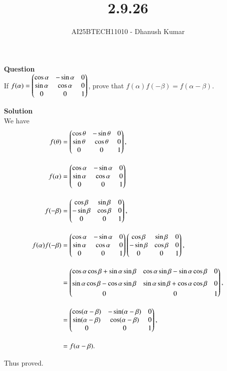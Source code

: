 \documentclass[journal]{IEEEtran}
\begin{document}
\title{2.9.26}
\author{AI25BTECH11010 - Dhanush Kumar}
\maketitle
\renewcommand{\thefigure}{\theenumi}
\renewcommand{\thetable}{\theenumi}

\noindent
\textbf{Question}\\
If $f(\alpha) = \begin{pmatrix}\cos\alpha & -\sin\alpha & 0 \\ \sin\alpha & \cos\alpha & 0 \\ 0 & 0 & 1\end{pmatrix}$,  
prove that $f(\alpha)f(-\beta) = f(\alpha-\beta)$.

\bigskip
\noindent

\textbf{Solution}\\

We have
\begin{align}
f(\theta) 
&= \begin{pmatrix}\cos\theta & -\sin\theta & 0 \\ \sin\theta & \cos\theta & 0 \\ 0 & 0 & 1\end{pmatrix}, \\[1em]
f(\alpha) 
	&= \begin{pmatrix}\cos\alpha & -\sin\alpha & 0 \\ \sin\alpha & \cos\alpha & 0 \\ 0 & 0 & 1\end{pmatrix}\\[1em]
f(-\beta) 
&= \begin{pmatrix}\cos\beta & \sin\beta & 0 \\ -\sin\beta & \cos\beta & 0 \\ 0 & 0 & 1\end{pmatrix}, \\[1em]
f(\alpha)f(-\beta) 
&= \begin{pmatrix}\cos\alpha & -\sin\alpha & 0 \\ \sin\alpha & \cos\alpha & 0 \\ 0 & 0 & 1\end{pmatrix}
   \begin{pmatrix}\cos\beta & \sin\beta & 0 \\ -\sin\beta & \cos\beta & 0 \\ 0 & 0 & 1\end{pmatrix}, \\[1em]
&= \begin{pmatrix}\cos\alpha\cos\beta + \sin\alpha\sin\beta & \cos\alpha\sin\beta - \sin\alpha\cos\beta & 0 \\[2mm]
          \sin\alpha\cos\beta - \cos\alpha\sin\beta & \sin\alpha\sin\beta + \cos\alpha\cos\beta & 0 \\[1mm]
          0 & 0 & 1\end{pmatrix}, \\[1em]
&= \begin{pmatrix}\cos(\alpha-\beta) & -\sin(\alpha-\beta) & 0 \\ \sin(\alpha-\beta) & \cos(\alpha-\beta) & 0 \\ 0 & 0 & 1\end{pmatrix}, \\[1em]
&= f(\alpha-\beta).
\end{align}

Thus proved.
\end{document}

